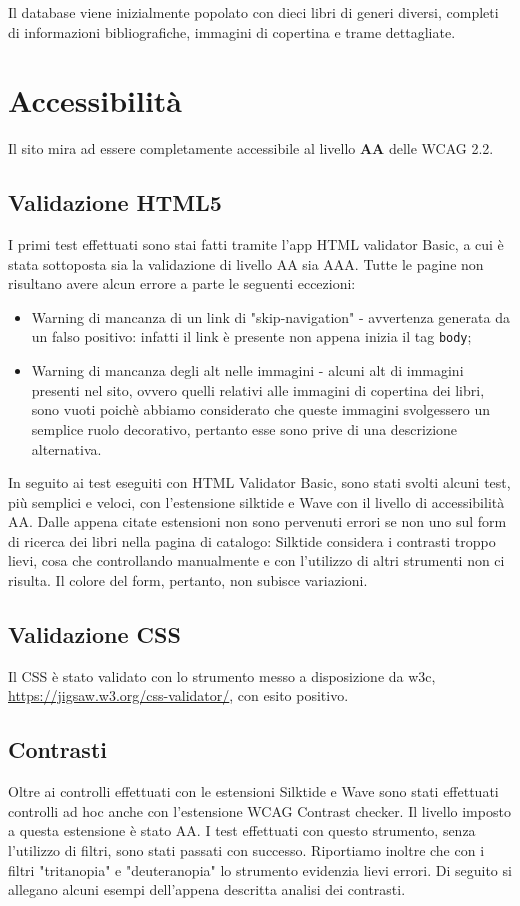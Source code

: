 \documentclass{article}
\begin{document}
Il database viene inizialmente popolato con dieci libri di generi diversi, completi di informazioni bibliografiche, immagini di copertina e trame dettagliate.

\newpage
\section{Accessibilità}
Il sito mira ad essere completamente accessibile al livello \textbf{AA} delle WCAG 2.2. 
\subsection{Validazione HTML5}
I primi test effettuati sono stai fatti tramite l'app HTML validator Basic, a cui è stata sottoposta sia la validazione di livello AA sia AAA. Tutte le pagine non risultano avere alcun errore a parte le seguenti eccezioni:
\begin{itemize}
    \item Warning di mancanza di un link di "skip-navigation" - avvertenza generata da un falso positivo: infatti il link è presente non appena inizia il tag \texttt{body};
    \item Warning di mancanza degli alt nelle immagini - alcuni alt di immagini presenti nel sito, ovvero quelli relativi alle immagini di copertina dei libri, sono vuoti poichè abbiamo considerato che queste immagini svolgessero un semplice ruolo decorativo, pertanto esse sono prive di una descrizione alternativa.
\end{itemize}

In seguito ai test eseguiti con HTML Validator Basic, sono stati svolti alcuni test, più semplici e veloci, con l'estensione silktide e Wave con il livello di accessibilità AA. Dalle appena citate estensioni non sono pervenuti errori se non uno sul form di ricerca dei libri nella pagina di catalogo: Silktide considera i contrasti troppo lievi, cosa che controllando manualmente e con l'utilizzo di altri strumenti non ci risulta. Il colore del form, pertanto, non subisce variazioni.

\subsection{Validazione CSS}
Il CSS è stato validato con lo strumento messo a disposizione da w3c, \url{https://jigsaw.w3.org/css-validator/}, con esito positivo.

\subsection{Contrasti}
Oltre ai controlli effettuati con le estensioni Silktide e Wave sono stati effettuati controlli ad hoc anche con l'estensione WCAG Contrast checker. Il livello imposto a questa estensione è stato AA. I test effettuati con questo strumento, senza l'utilizzo di filtri, sono stati passati con successo. Riportiamo inoltre che con i filtri "tritanopia" e "deuteranopia" lo strumento evidenzia lievi errori. Di seguito si allegano alcuni esempi dell'appena descritta analisi dei contrasti.
\end{document}
